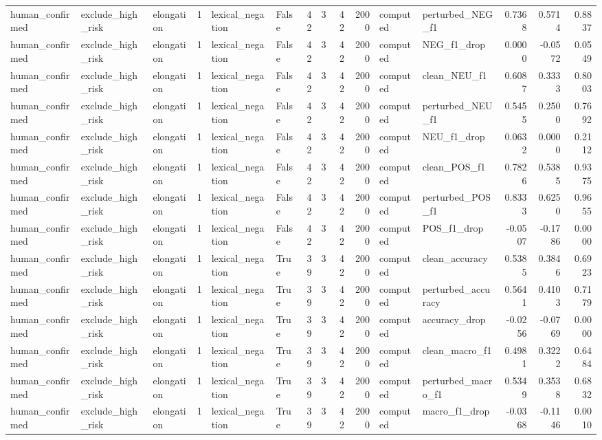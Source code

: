 \begin{tabular}{lllrllrrrrllrrr}
human_confirmed & exclude_high_risk & elongation & 1 & lexical_negation & False & 42 & 3 & 42 & 2000 & computed & perturbed_NEG_f1 & 0.7368 & 0.5714 & 0.8837 \\
human_confirmed & exclude_high_risk & elongation & 1 & lexical_negation & False & 42 & 3 & 42 & 2000 & computed & NEG_f1_drop & 0.0000 & -0.0572 & 0.0549 \\
human_confirmed & exclude_high_risk & elongation & 1 & lexical_negation & False & 42 & 3 & 42 & 2000 & computed & clean_NEU_f1 & 0.6087 & 0.3333 & 0.8003 \\
human_confirmed & exclude_high_risk & elongation & 1 & lexical_negation & False & 42 & 3 & 42 & 2000 & computed & perturbed_NEU_f1 & 0.5455 & 0.2500 & 0.7692 \\
human_confirmed & exclude_high_risk & elongation & 1 & lexical_negation & False & 42 & 3 & 42 & 2000 & computed & NEU_f1_drop & 0.0632 & 0.0000 & 0.2112 \\
human_confirmed & exclude_high_risk & elongation & 1 & lexical_negation & False & 42 & 3 & 42 & 2000 & computed & clean_POS_f1 & 0.7826 & 0.5385 & 0.9375 \\
human_confirmed & exclude_high_risk & elongation & 1 & lexical_negation & False & 42 & 3 & 42 & 2000 & computed & perturbed_POS_f1 & 0.8333 & 0.6250 & 0.9655 \\
human_confirmed & exclude_high_risk & elongation & 1 & lexical_negation & False & 42 & 3 & 42 & 2000 & computed & POS_f1_drop & -0.0507 & -0.1786 & 0.0000 \\
human_confirmed & exclude_high_risk & elongation & 1 & lexical_negation & True & 39 & 3 & 42 & 2000 & computed & clean_accuracy & 0.5385 & 0.3846 & 0.6923 \\
human_confirmed & exclude_high_risk & elongation & 1 & lexical_negation & True & 39 & 3 & 42 & 2000 & computed & perturbed_accuracy & 0.5641 & 0.4103 & 0.7179 \\
human_confirmed & exclude_high_risk & elongation & 1 & lexical_negation & True & 39 & 3 & 42 & 2000 & computed & accuracy_drop & -0.0256 & -0.0769 & 0.0000 \\
human_confirmed & exclude_high_risk & elongation & 1 & lexical_negation & True & 39 & 3 & 42 & 2000 & computed & clean_macro_f1 & 0.4981 & 0.3222 & 0.6484 \\
human_confirmed & exclude_high_risk & elongation & 1 & lexical_negation & True & 39 & 3 & 42 & 2000 & computed & perturbed_macro_f1 & 0.5349 & 0.3538 & 0.6832 \\
human_confirmed & exclude_high_risk & elongation & 1 & lexical_negation & True & 39 & 3 & 42 & 2000 & computed & macro_f1_drop & -0.0368 & -0.1146 & 0.0010 \\

\end{tabular}
